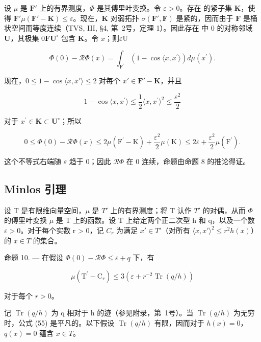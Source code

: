 设 \(\mu\) 是 \(\mathbf{F}'\) 上的有界测度，\(\Phi\) 是其傅里叶变换。令 \(\varepsilon > 0\)。存在  的紧子集 \(\mathbf{K}\)，使得 \(\mathbf{F}'\)\(\mu(\mathbf{F}' - \mathbf{K}) \leqslant \varepsilon\)。现在，\(\mathbf{K}\) 对弱拓扑 \(\sigma(\mathbf{F}', \mathbf{F})\) 是紧的，因而由于 \(\mathbf{F}\) 是桶状空间而等度连续（TVS, III, §4, 第~2号，定理 1）。因此存在  中 0 的对称邻域 \(\mathbf{U}\)，其极集 \(0\)\(\mathbf{F}\)\(\mathbf{U}^{\circ}\) 包含 \(\mathbf{K}\)。令 \(x\)；则\(\varepsilon \mathrm{U}\)

\[
\Phi (0) - \mathcal {R} \Phi (x) = \int_ {\mathrm{F} ^ {\prime}} \left(1 - \cos \langle x, x ^ {\prime} \rangle\right) d \mu (x ^ {\prime}).
\]

现在，\(0 \leqslant 1 - \cos \langle x, x' \rangle \leqslant 2\) 对每个 \(x' \in \mathbf{F}' - \mathbf{K}\)，并且

\[
1 - \cos \langle x, x ^ {\prime} \rangle \leqslant \frac {1}{2} \langle x, x ^ {\prime} \rangle^ {2} \leqslant \frac {\varepsilon^ {2}}{2}
\]

对于 \(x^{\prime}\in \mathbf{K}\subset \mathbf{U}^{\circ}\)；所以

\[
0 \leqslant \Phi (0) - \mathcal {R} \Phi (x) \leqslant 2 \mu (\mathrm{F} ^ {\prime} - \mathrm{K}) + \frac {\varepsilon^ {2}}{2} \mu (\mathrm{K}) \leqslant 2 \varepsilon + \frac {\varepsilon^ {2}}{2} \mu (\mathrm{F} ^ {\prime}).
\]

这个不等式右端随 \(\varepsilon\) 趋于 0；因此 \(\mathcal{R}\Phi\) 在 0 连续，命题由命题 8 的推论得证。

\subsection{Minlos 引理}

设 T 是有限维向量空间，\(\mu\) 是 \(T'\) 上的有界测度；将 T 认作 \(T'\) 的对偶，从而 \(\Phi\) 的傅里叶变换 \(\mu\) 是 T 上的函数。设 T 上给定两个正二次型 h 和 q，以及一个数 \(\varepsilon > 0\)。对于每个实数 r > 0，记 \(C_{r}\) 为满足 \(x' \in T'\)（对所有 \(\langle x, x' \rangle^{2} \leqslant r^{2} h(x)\)）的 \(x \in T\) 的集合。

命题 10. --- 在假设 \(\Phi(0) - \mathcal{R}\Phi \leqslant \varepsilon + q\) 下，有

\[
\mu (\mathrm{T} ^ {\prime} - \mathrm{C} _ {r}) \leqslant 3 \left(\varepsilon + r ^ {- 2} \operatorname{Tr} (q / h)\right)\tag{55}
\]

对于每个 \(r > 0\)。

记 \(\operatorname{Tr}(q/h)\) 为 q 相对于 h 的迹（参见附录，第~1号）。当 \(\operatorname{Tr}(q/h)\) 为无穷时，公式 (55) 是平凡的。以下假设 \(\operatorname{Tr}(q/h)\) 有限，因而对于 \(h(x)=0\)，\(q(x)=0\) 蕴含 \(x\in T\)。

